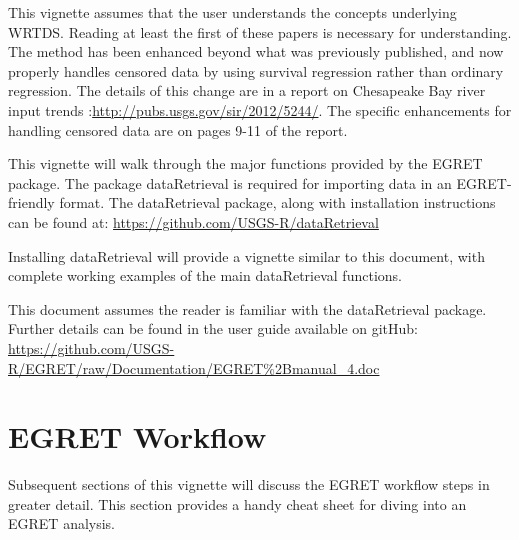 \documentclass[a4paper,11pt]{article}\usepackage[]{graphicx}\usepackage[]{color}
\begin{document}
This vignette assumes that the user understands the concepts underlying WRTDS.  Reading at least the first of these papers is necessary for understanding.  The method has been enhanced beyond what was previously published, and now properly handles censored data by using survival regression rather than ordinary regression.  The details of this change are in a report on Chesapeake Bay river input trends \cite{HirschIV}:\url{http://pubs.usgs.gov/sir/2012/5244/}.  The specific enhancements for handling censored data are on pages 9-11 of the report.

This vignette will walk through the major functions provided by the EGRET package. The package dataRetrieval is required for importing data in an EGRET-friendly format. The dataRetrieval package, along with installation instructions can be found at:
\url{https://github.com/USGS-R/dataRetrieval}

Installing dataRetrieval will provide a vignette similar to this document, with complete working examples of the main dataRetrieval functions.

This document assumes the reader is familiar with the dataRetrieval package. Further details can be found in the user guide available on gitHub: \url{https://github.com/USGS-R/EGRET/raw/Documentation/EGRET%2Bmanual_4.doc}

\section{EGRET Workflow}
Subsequent sections of this vignette will discuss the EGRET workflow steps in greater detail. This section provides a handy cheat sheet for diving into an EGRET analysis.
\end{document}
